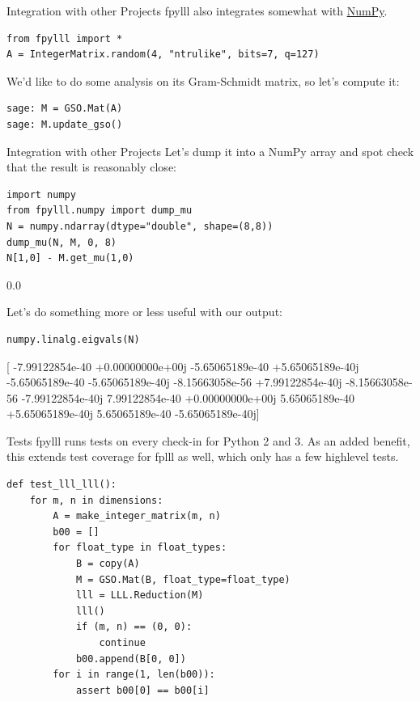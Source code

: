 \documentclass[presentation,smaller]{beamer}
\begin{document}
\begin{frame}[fragile,label={sec:orgheadline28}]{Integration with other Projects}
 \alert{fpylll} also integrates somewhat with \href{http://www.numpy.org}{NumPy}.

\lstset{language=Python,label= ,caption= ,captionpos=b,numbers=none}
\begin{lstlisting}
from fpylll import *
A = IntegerMatrix.random(4, "ntrulike", bits=7, q=127)
\end{lstlisting}

We’d like to do some analysis on its Gram-Schmidt matrix, so let’s compute it:

\lstset{language=Python,label= ,caption= ,captionpos=b,numbers=none}
\begin{lstlisting}
sage: M = GSO.Mat(A)
sage: M.update_gso()
\end{lstlisting}
\end{frame}

\begin{frame}[fragile,label={sec:orgheadline29}]{Integration with other Projects}
 Let’s dump it into a NumPy array and spot check that the result is reasonably close:

\lstset{language=Python,label= ,caption= ,captionpos=b,numbers=none}
\begin{lstlisting}
import numpy
from fpylll.numpy import dump_mu
N = numpy.ndarray(dtype="double", shape=(8,8))
dump_mu(N, M, 0, 8)
N[1,0] - M.get_mu(1,0)
\end{lstlisting}

0.0

Let’s do something more or less useful with our output:

\lstset{language=Python,label= ,caption= ,captionpos=b,numbers=none}
\begin{lstlisting}
numpy.linalg.eigvals(N)
\end{lstlisting}

[ -7.99122854e-40 +0.00000000e+00j  -5.65065189e-40 +5.65065189e-40j
  -5.65065189e-40 -5.65065189e-40j  -8.15663058e-56 +7.99122854e-40j
  -8.15663058e-56 -7.99122854e-40j   7.99122854e-40 +0.00000000e+00j
   5.65065189e-40 +5.65065189e-40j   5.65065189e-40 -5.65065189e-40j]
\end{frame}

\begin{frame}[fragile,label={sec:orgheadline30}]{Tests}
 \alert{fpylll} runs tests on every check-in for Python 2 and 3. As an added benefit, this extends test coverage for \alert{fplll} as well, which only has a few highlevel tests.

\lstset{language=Python,label= ,caption= ,captionpos=b,numbers=none}
\begin{lstlisting}
def test_lll_lll():
    for m, n in dimensions:
        A = make_integer_matrix(m, n)
        b00 = []
        for float_type in float_types:
            B = copy(A)
            M = GSO.Mat(B, float_type=float_type)
            lll = LLL.Reduction(M)
            lll()
            if (m, n) == (0, 0):
                continue
            b00.append(B[0, 0])
        for i in range(1, len(b00)):
            assert b00[0] == b00[i]
\end{lstlisting}
\end{frame}
\end{document}
